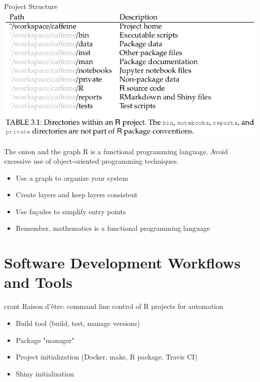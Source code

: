 \documentclass{beamer}
\begin{document}
\begin{frame}{Project Structure}
\includegraphics[width=\linewidth]{images/directory_structure}
\end{frame}


\begin{frame}{The onion and the graph}
R is a functional programming language.
Avoid excessive use of object-oriented programming techniques.

\begin{itemize}
\item Use a graph to organize your system
\item Create layers and keep layers consistent
\item Use fa\c{c}ades to simplify entry points
\item Remember, mathematics is a functional programming language
\end{itemize}

\end{frame}



\section{Software Development Workflows and Tools}

\begin{frame}{crant}
Raison d'\^{e}tre: command line control of R projects for automation

\begin{itemize}
\item Build tool (build, test, manage versions)
\item Package "manager"
\item Project initialization (Docker, make, R package, Travis CI)
\item Shiny initialization
\end{itemize}
\end{frame}
\end{document}
